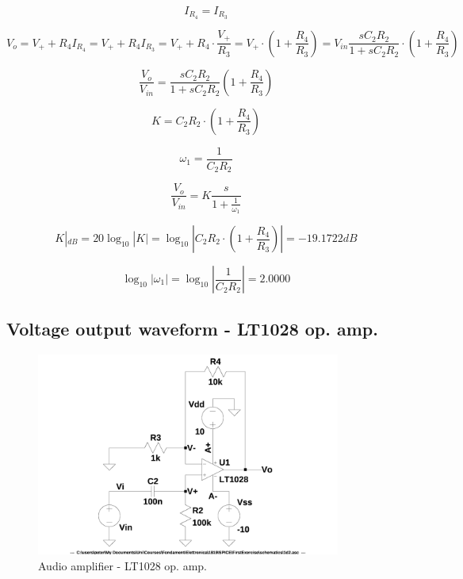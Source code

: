 \documentclass[10pt,a4paper]{article}
\begin{document}
\begin{equation} \label{eq:I_R4}
I_{R_4} = I_{R_3}
\end{equation}

\begin{equation} \label{eq:V_o}
V_o = V_+ + R_4I_{R_4} = V_+ + R_4 I_{R_3} = V_+ + R_4 \cdot \frac{V_+}{R_3} =
V_+ \cdot \left(1 + \frac{R_4}{R_3} \right) =
V_{in}\frac{sC_2R_2}{1+sC_2R_2} \cdot \left(1 + \frac{R_4}{R_3} \right)
\end{equation}

\begin{equation} \label{eq:TF}
\frac{V_o}{V_{in}} = \frac{sC_2R_2}{1+sC_2R_2}\left(1+\frac{R_4}{R_3}\right)
\end{equation}

\begin{equation} \label{eq:K}
K = C_2R_2 \cdot \left(1+\frac{R_4}{R_3}\right)
\end{equation}

\begin{equation} \label{eq:omega_1}
 \omega_1 = \frac{1}{C_2R_2}
\end{equation}

\begin{equation} \label{eq:TFBode}
\frac{V_o}{V_{in}} = K \frac{s}{1+\frac{1}{\omega_1}}
\end{equation}

\begin{equation} \label{eq:KdB}
 K|_{dB} = 20\log_{10}|K| = \log_{10}\left|C_2R_2 \cdot \left(1+\frac{R_4}{R_3}\right)\right| = -19.1722 dB
\end{equation}

\begin{equation} \label{eq:omega_1log}
\log_{10} |\omega_1| =
\log_{10} \left| \frac{1}{C_2R_2} \right|= 2.0000
\end{equation}

\subsection{Voltage output waveform - LT1028 op. amp.}
\begin{figure}[h]
  \centering
  \includegraphics[width=10cm]{schematics/1d2.jpg}
  \caption{Audio amplifier - LT1028 op. amp.}
  \label{1d2schematics}
\end{figure}
\end{document}
